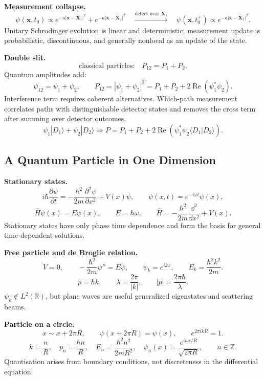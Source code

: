 \noindent\textbf{Measurement collapse.}
\[
\psi(\mathbf{x},t_0)\propto
e^{-a|\mathbf{x}-\mathbf{X}_1|^2}+e^{-a|\mathbf{x}-\mathbf{X}_2|^2}
\quad\xrightarrow{\text{detect near }\mathbf{X}_1}\quad
\psi(\mathbf{x},t_0^+)\propto e^{-a|\mathbf{x}-\mathbf{X}_1|^2}.
\]
Unitary Schrodinger evolution is linear and deterministic; measurement update
is probabilistic, discontinuous, and generally nonlocal as an update of the state.

\noindent\textbf{Double slit.}
\[
\text{classical particles:}\quad P_{12}=P_1+P_2.
\]
Quantum amplitudes add:
\[
\psi_{12}=\psi_1+\psi_2,\qquad
P_{12}=|\psi_1+\psi_2|^2=P_1+P_2+2\operatorname{Re}(\psi_1^*\psi_2).
\]
Interference term requires coherent alternatives. Which-path measurement
correlates paths with distinguishable detector states and removes the cross term
after summing over detector outcomes.
\[
\psi_1|D_1\rangle+\psi_2|D_2\rangle
\Longrightarrow
P=P_1+P_2+2\operatorname{Re}\!\left(\psi_1^*\psi_2\langle D_1|D_2\rangle\right).
\]

\subsection{A Quantum Particle in One Dimension}

\noindent\textbf{Stationary states.}
\[
i\hbar\frac{\partial\psi}{\partial t}
=-\frac{\hbar^2}{2m}\frac{\partial^2\psi}{\partial x^2}+V(x)\psi,\qquad
\psi(x,t)=e^{-i\omega t}\psi(x),
\]
\[
\boxed{\hat H\psi(x)=E\psi(x)},\qquad E=\hbar\omega,\qquad
\hat H=-\frac{\hbar^2}{2m}\frac{\dd^2}{\dd x^2}+V(x).
\]
Stationary states have only phase time dependence and form the basis for
general time-dependent solutions.

\noindent\textbf{Free particle and de Broglie relation.}
\[
V=0,\qquad -\frac{\hbar^2}{2m}\psi''=E\psi,\qquad
\psi_k=e^{ikx},\qquad
E_k=\frac{\hbar^2k^2}{2m}.
\]
\[
\boxed{p=\hbar k},\qquad
\lambda=\frac{2\pi}{|k|},\qquad |p|=\frac{2\pi\hbar}{\lambda}.
\]
\(\psi_k\notin L^2(\mathbb{R})\), but plane waves are useful generalized
eigenstates and scattering beams.

\noindent\textbf{Particle on a circle.}
\[
x\sim x+2\pi R,\qquad \psi(x+2\pi R)=\psi(x),\qquad
e^{2\pi ikR}=1.
\]
\[
k=\frac{n}{R},\quad
p_n=\frac{\hbar n}{R},\quad
E_n=\frac{\hbar^2 n^2}{2mR^2},\quad
\psi_n(x)=\frac{e^{inx/R}}{\sqrt{2\pi R}},\qquad n\in\mathbb{Z}.
\]
Quantisation arises from boundary conditions, not discreteness in the
differential equation.


